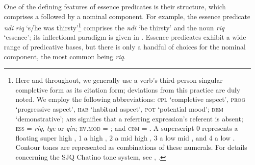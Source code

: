 \documentclass[output=paper]{langsci/langscibook}
\begin{document}
One of the defining features of essence predicates  is their structure, which comprises a  followed by a nominal component.  For example, the essence predicate \emph{ndi}
\emph{riq} `s/he was thirsty'\footnote{Here and throughout, we generally use a verb's third-person singular completive form as its
citation form; deviations from this practice are duly noted. We employ the following abbreviations:
\textsc{cpl} `completive aspect', \textsc{prog} `progressive aspect', \textsc{hab} `habitual aspect', \textsc{pot} `potential mood'; \textsc{dem}
`demonstrative'; \textsc{abs} signifies that a referring expression's referent is absent; \textsc{ess} = \emph{riq}, \emph{tye} or \emph{qin}; \textsc{ev.mod} = ; and \textsc{cbm} = . A superscript 0 represents a
floating super high , 1 a high , 2 a mid high , 3 a low mid , and 4 a low .
Contour tones are represented as combinations of these numerals. For details concerning the SJQ Chatino tone system, see \cite{ECruz2011}, \cite{WoodburyToAppear}.} comprises the  \emph{ndi} `be thirsty' and the noun \emph{riq} `essence'; its inflectional paradigm is given in .  Essence predicates exhibit a wide range of predicative bases, but there is only a handful of choices for the nominal component, the most common being \emph{riq}. 
\end{document}
